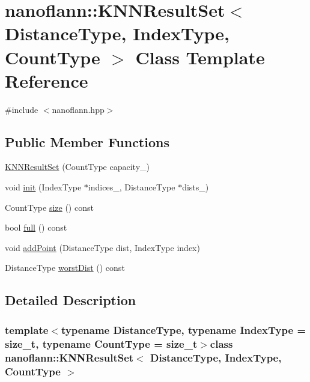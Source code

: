 \hypertarget{classnanoflann_1_1_k_n_n_result_set}{\section{nanoflann\-:\-:K\-N\-N\-Result\-Set$<$ Distance\-Type, Index\-Type, Count\-Type $>$ Class Template Reference}
\label{classnanoflann_1_1_k_n_n_result_set}
}


{\ttfamily \#include $<$nanoflann.\-hpp$>$}

\subsection*{Public Member Functions}
\begin{DoxyCompactItemize}
\item 
\hyperlink{classnanoflann_1_1_k_n_n_result_set_aa6696a234675a151e367a473b9845286}{K\-N\-N\-Result\-Set} (Count\-Type capacity\-\_\-)
\item 
void \hyperlink{classnanoflann_1_1_k_n_n_result_set_a3e472126b7b71e3d0ab5c41995801f4d}{init} (Index\-Type $\ast$indices\-\_\-, Distance\-Type $\ast$dists\-\_\-)
\item 
Count\-Type \hyperlink{classnanoflann_1_1_k_n_n_result_set_a898f4cea82346d58c00aeb5981fecdd8}{size} () const 
\item 
bool \hyperlink{classnanoflann_1_1_k_n_n_result_set_af3e2dfe50472001d0b4dd372cecd74d7}{full} () const 
\item 
void \hyperlink{classnanoflann_1_1_k_n_n_result_set_a617bfcdec87d7d1fa28a0674c5a433df}{add\-Point} (Distance\-Type dist, Index\-Type index)
\item 
Distance\-Type \hyperlink{classnanoflann_1_1_k_n_n_result_set_aa29099bc2a68a9cf162796da072a2e50}{worst\-Dist} () const 
\end{DoxyCompactItemize}


\subsection{Detailed Description}
\subsubsection*{template$<$typename Distance\-Type, typename Index\-Type = size\-\_\-t, typename Count\-Type = size\-\_\-t$>$class nanoflann\-::\-K\-N\-N\-Result\-Set$<$ Distance\-Type, Index\-Type, Count\-Type $>$}

